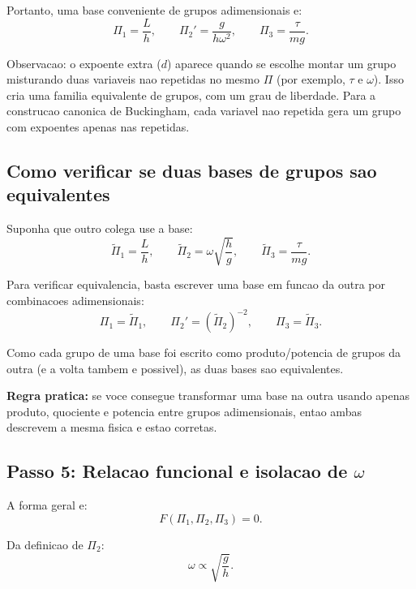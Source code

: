 \documentclass[12pt,a4paper]{article}
\begin{document}
Portanto, uma base conveniente de grupos adimensionais e:
\begin{equation}
\Pi_1 = \frac{L}{h},
\qquad
\Pi_2' = \frac{g}{h\omega^2},
\qquad
\Pi_3 = \frac{\tau}{mg}.
\end{equation}

Observacao: o expoente extra ($d$) aparece quando se escolhe montar um grupo misturando duas variaveis nao repetidas no mesmo $\Pi$ (por exemplo, $\tau$ e $\omega$). Isso cria uma familia equivalente de grupos, com um grau de liberdade. Para a construcao canonica de Buckingham, cada variavel nao repetida gera um grupo com expoentes apenas nas repetidas.

\subsection*{Como verificar se duas bases de grupos sao equivalentes}
Suponha que outro colega use a base:
\begin{equation}
\widetilde{\Pi}_1=\frac{L}{h},
\qquad
\widetilde{\Pi}_2=\omega\sqrt{\frac{h}{g}},
\qquad
\widetilde{\Pi}_3=\frac{\tau}{mg}.
\end{equation}

Para verificar equivalencia, basta escrever uma base em funcao da outra por combinacoes adimensionais:
\begin{equation}
\Pi_1=\widetilde{\Pi}_1,
\qquad
\Pi_2'=(\widetilde{\Pi}_2)^{-2},
\qquad
\Pi_3=\widetilde{\Pi}_3.
\end{equation}

Como cada grupo de uma base foi escrito como produto/potencia de grupos da outra (e a volta tambem e possivel), as duas bases sao equivalentes.

\textbf{Regra pratica:} se voce consegue transformar uma base na outra usando apenas produto, quociente e potencia entre grupos adimensionais, entao ambas descrevem a mesma fisica e estao corretas.

\subsection*{Passo 5: Relacao funcional e isolacao de $\omega$}
A forma geral e:
\begin{equation}
F(\Pi_1,\Pi_2,\Pi_3)=0.
\end{equation}

Da definicao de $\Pi_2$:
\begin{equation}
\omega \propto \sqrt{\frac{g}{h}}.
\end{equation}
\end{document}
